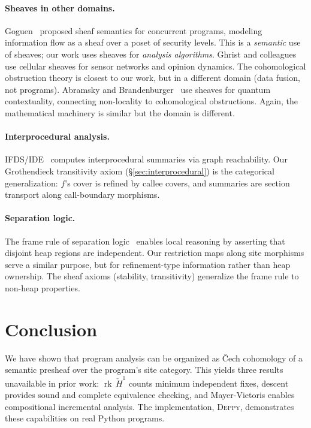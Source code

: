 \documentclass[acmsmall,screen]{acmart}
\theoremstyle{remark}
\newcommand{\Hc}[1]{\check{H}^{#1}}
\newcommand{\rk}{\operatorname{rk}}
\begin{document}
\paragraph{Sheaves in other domains.}
Goguen~\cite{Goguen92} proposed sheaf semantics for concurrent programs,
modeling information flow as a sheaf over a poset of security levels.
This is a \emph{semantic} use of sheaves; our work uses sheaves for
\emph{analysis algorithms}.
Ghrist and colleagues~\cite{Ghrist14,HansenGhrist19} use cellular
sheaves for sensor networks and opinion dynamics.  The cohomological
obstruction theory is closest to our work, but in a different domain
(data fusion, not programs).
Abramsky and Brandenburger~\cite{AbramskyBrandenburger11} use sheaves
for quantum contextuality, connecting non-locality to cohomological
obstructions.  Again, the mathematical machinery is similar but the
domain is different.

\paragraph{Interprocedural analysis.}
IFDS/IDE~\cite{RepsHorwitzSagiv95} computes interprocedural summaries
via graph reachability.  Our Grothendieck transitivity axiom
(\S\ref{sec:interprocedural}) is the categorical generalization:
$f$'s cover is refined by callee covers, and summaries are section
transport along call-boundary morphisms.

\paragraph{Separation logic.}
The frame rule of separation logic~\cite{OHearnReynoldsYang01}
enables local reasoning by asserting that disjoint heap regions are
independent.  Our restriction maps along site morphisms serve a
similar purpose, but for refinement-type information rather than heap
ownership.  The sheaf axioms (stability, transitivity) generalize the
frame rule to non-heap properties.

\section{Conclusion}\label{sec:conclusion}

We have shown that program analysis can be organized as \v{C}ech
cohomology of a semantic presheaf over the program's site category.
This yields three results unavailable in prior work:
$\rk\,\Hc{1}$ counts minimum independent fixes, descent provides
sound and complete equivalence checking, and Mayer-Vietoris enables
compositional incremental analysis.  The implementation,
\textsc{Deppy}, demonstrates these capabilities on real Python
programs.
\end{document}
